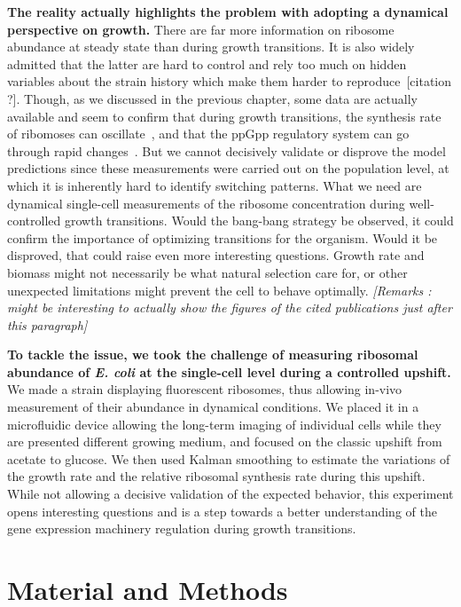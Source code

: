 \textbf{The reality actually highlights the problem with adopting a dynamical perspective on growth.}
There are far more information on ribosome abundance at steady state than during growth transitions.
It is also widely admitted that the latter are hard to control and rely too much on hidden variables about the strain history which make them harder to reproduce~[citation ?].
Though, as we discussed in the previous chapter, some data are actually available and seem to confirm that during growth transitions, the  synthesis rate of ribomoses can oscillate~\cite{gausing_regulation_1980,zengel_transcription_1986}, and that the ppGpp regulatory system can go through rapid changes~\cite{friesen_synthesis_1975,murray_control_2003}.
But we cannot decisively validate or disprove the model predictions since these measurements were carried out on the population level, at which it is inherently hard to identify switching patterns.
What we need are dynamical single-cell measurements of the ribosome concentration during well-controlled growth transitions.
Would the bang-bang strategy be observed, it could confirm the importance of optimizing transitions for the organism.
Would it be disproved, that could raise even more interesting questions.
Growth rate and biomass might not necessarily be what natural selection care for, or other unexpected limitations might prevent the cell to behave optimally.
\textit{[Remarks : might be interesting to actually show the figures of the cited publications just after this paragraph]}

\textbf{To tackle the issue, we took the challenge of measuring ribosomal abundance of \textit{E. coli} at the single-cell level during a controlled upshift.}
We made a strain displaying fluorescent ribosomes, thus allowing in-vivo measurement of their abundance in dynamical conditions.
We placed it in a microfluidic device allowing the long-term imaging of individual cells while they are presented different growing medium, and focused on the classic upshift from acetate to glucose.
We then used Kalman smoothing to estimate the variations of the growth rate and the relative ribosomal synthesis rate during this upshift.
While not allowing a decisive validation of the expected behavior, this experiment opens interesting questions and is a step towards a better understanding of the gene expression machinery regulation during growth transitions.

\section{Material and Methods}

